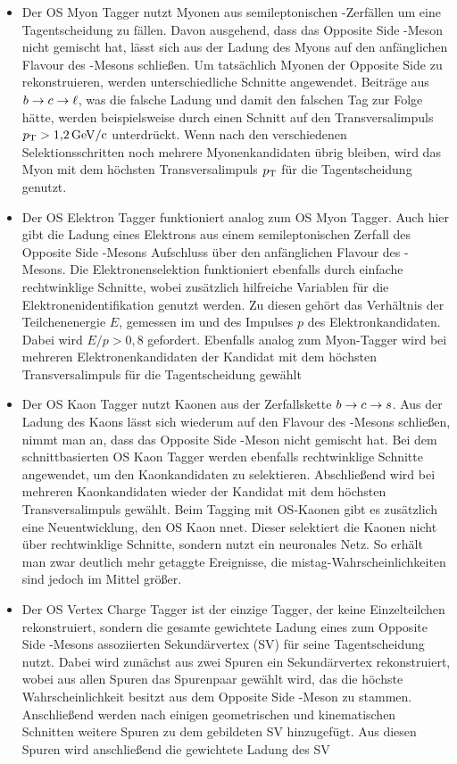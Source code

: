 \begin{itemize}
\item Der OS Myon Tagger nutzt Myonen aus semileptonischen \B-Zerfällen um eine Tagentscheidung zu fällen. Davon ausgehend, dass das Opposite Side \B-Meson nicht gemischt hat, lässt sich aus der Ladung des Myons auf den anfänglichen Flavour des \B-Mesons schließen. Um tatsächlich Myonen der Opposite Side zu rekonstruieren, werden unterschiedliche Schnitte angewendet. Beiträge aus $\bquark\rightarrow\cquark\rightarrow\lepton$, was die falsche Ladung und damit den falschen Tag zur Folge hätte, werden beispielsweise durch einen Schnitt auf den Transversalimpuls $\pt>\SI{1{,}2}{GeV\per c}$ unterdrückt. Wenn nach den verschiedenen Selektionsschritten noch mehrere Myonenkandidaten übrig bleiben, wird das Myon mit dem höchsten Transversalimpuls $\pt$ für die Tagentscheidung genutzt.
\item Der OS Elektron Tagger funktioniert analog zum OS Myon Tagger. Auch hier gibt die Ladung eines Elektrons aus einem semileptonischen Zerfall des Opposite Side \B-Mesons Aufschluss über den anfänglichen Flavour des \B-Mesons. Die Elektronenselektion funktioniert ebenfalls durch einfache rechtwinklige Schnitte, wobei zusätzlich hilfreiche Variablen für die Elektronenidentifikation genutzt werden. Zu diesen gehört das Verhältnis der Teilchenenergie $E$, gemessen im \ecal und des Impulses $p$ des Elektronkandidaten. Dabei wird $E/p>0{,}8$ gefordert. Ebenfalls analog zum Myon-Tagger wird bei mehreren Elektronenkandidaten der Kandidat mit dem höchsten Transversalimpuls \pt für die Tagentscheidung gewählt
\item Der OS Kaon Tagger nutzt Kaonen aus der Zerfallskette $\bquark\rightarrow\cquark\rightarrow\squark$. Aus der Ladung des Kaons lässt sich wiederum auf den Flavour des \B-Mesons schließen, nimmt man an, dass das Opposite Side \B-Meson nicht gemischt hat. Bei dem schnittbasierten OS Kaon Tagger werden ebenfalls rechtwinklige Schnitte angewendet, um den Kaonkandidaten zu selektieren. Abschließend wird bei mehreren Kaonkandidaten wieder der Kandidat mit dem höchsten Transversalimpuls \pt gewählt. Beim Tagging mit OS-Kaonen gibt es zusätzlich eine Neuentwicklung, den OS Kaon nnet. Dieser selektiert die Kaonen nicht über rechtwinklige Schnitte, sondern nutzt ein neuronales Netz. So erhält man zwar deutlich mehr getaggte Ereignisse, die mistag-Wahrscheinlichkeiten sind jedoch im Mittel größer.
\item Der OS Vertex Charge Tagger ist der einzige Tagger, der keine Einzelteilchen rekonstruiert, sondern die gesamte gewichtete Ladung eines zum Opposite Side \B-Mesons assoziierten Sekundärvertex (SV) für seine Tagentscheidung nutzt. Dabei wird zunächst aus zwei Spuren ein Sekundärvertex rekonstruiert, wobei aus allen Spuren das Spurenpaar gewählt wird, das die höchste Wahrscheinlichkeit besitzt aus dem Opposite Side \B-Meson zu stammen. Anschließend werden nach einigen geometrischen und kinematischen Schnitten weitere Spuren zu dem gebildeten SV hinzugefügt. Aus diesen Spuren wird anschließend die gewichtete Ladung des SV

\end{itemize}
